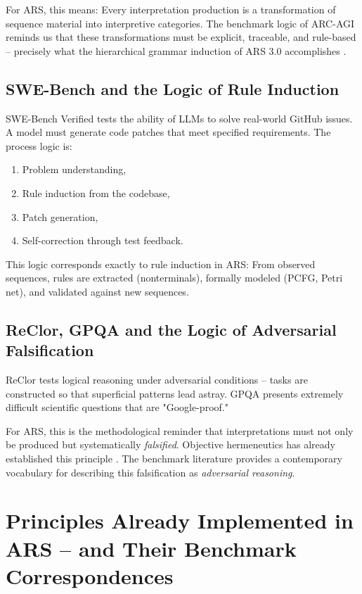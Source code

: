 \documentclass[12pt,a4paper]{article}
\begin{document}
For ARS, this means: Every interpretation production is a transformation of sequence material into interpretive categories. The benchmark logic of ARC-AGI reminds us that these transformations must be explicit, traceable, and rule-based – precisely what the hierarchical grammar induction of ARS 3.0 accomplishes \cite{koop2024pcfg}.

\subsection{SWE-Bench and the Logic of Rule Induction}

SWE-Bench Verified \cite{jimenez2024swe} tests the ability of LLMs to solve real-world GitHub issues. A model must generate code patches that meet specified requirements. The process logic is:

\begin{enumerate}
    \item Problem understanding,
    \item Rule induction from the codebase,
    \item Patch generation,
    \item Self-correction through test feedback.
\end{enumerate}

This logic corresponds exactly to rule induction in ARS: From observed sequences, rules are extracted (nonterminals), formally modeled (PCFG, Petri net), and validated against new sequences.

\subsection{ReClor, GPQA and the Logic of Adversarial Falsification}

ReClor \cite{yu2020reclor} tests logical reasoning under adversarial conditions – tasks are constructed so that superficial patterns lead astray. GPQA \cite{rein2024gpqa} presents extremely difficult scientific questions that are "Google-proof."

For ARS, this is the methodological reminder that interpretations must not only be produced but systematically \textit{falsified}. Objective hermeneutics has already established this principle \cite{oevermann1979methodology}. The benchmark literature provides a contemporary vocabulary for describing this falsification as \textit{adversarial reasoning}.

\section{Principles Already Implemented in ARS – and Their Benchmark Correspondences}
\end{document}
